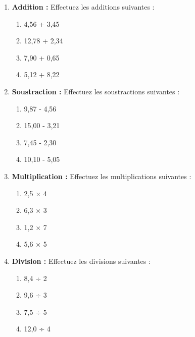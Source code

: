 \documentclass{article}
\begin{document}
\begin{tcolorbox}[colback=yellow!10!white, colframe=yellow!75!black, sharp corners=south, boxrule=0.8mm, title=Exercices]
\begin{enumerate}[label=\textbf{\arabic*.}]
        \item \textbf{Addition :} Effectuez les additions suivantes :
            \begin{enumerate}
                \item 4,56 + 3,45
                \item 12,78 + 2,34
                \item 7,90 + 0,65
                \item 5,12 + 8,22
            \end{enumerate}

        \item \textbf{Soustraction :} Effectuez les soustractions suivantes :
            \begin{enumerate}
                \item 9,87 - 4,56
                \item 15,00 - 3,21
                \item 7,45 - 2,30
                \item 10,10 - 5,05
            \end{enumerate}

        \item \textbf{Multiplication :} Effectuez les multiplications suivantes :
            \begin{enumerate}
                \item 2,5 × 4
                \item 6,3 × 3
                \item 1,2 × 7
                \item 5,6 × 5
            \end{enumerate}

        \item \textbf{Division :} Effectuez les divisions suivantes :
            \begin{enumerate}
                \item 8,4 ÷ 2
                \item 9,6 ÷ 3
                \item 7,5 ÷ 5
                \item 12,0 ÷ 4
            \end{enumerate}
    \end{enumerate}
\end{tcolorbox}
\end{document}
